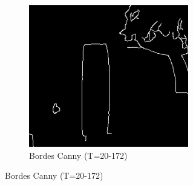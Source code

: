 \begin{figure}[H]
\begin{subfigure}[b]{0.48\textwidth}
    \includegraphics[width=\textwidth]{imagenes/detector_tubos_2_canny.png}
    \caption{Bordes Canny (T=20-172)}
\end{subfigure}

\vspace{0.3cm}


\end{figure}
